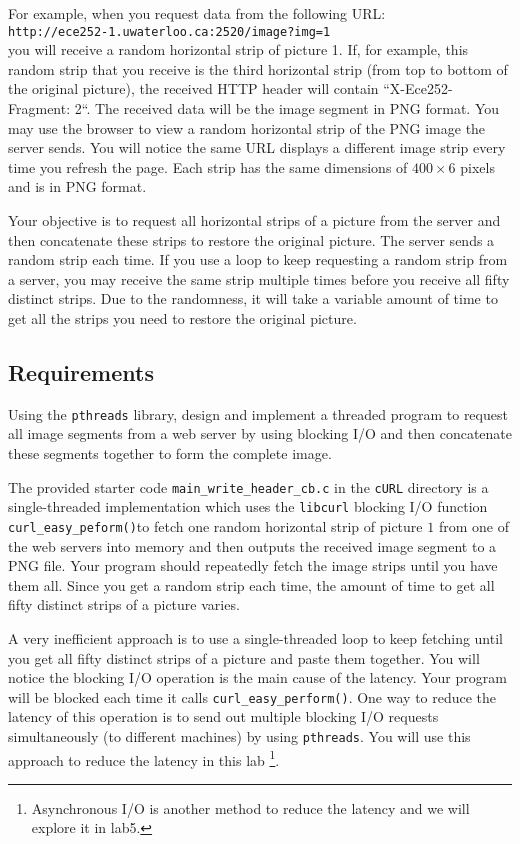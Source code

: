 For example, when you request data from the following URL: \\
\verb+http://ece252-1.uwaterloo.ca:2520/image?img=1+  \\
you will receive a random horizontal strip of picture 1. If, for example, this random strip that you receive is the third horizontal strip (from top to bottom of the original picture), the received HTTP header will contain ``X-Ece252-Fragment: 2``. The received data will be the image segment in PNG format.
You may use the browser to view a random horizontal strip of the PNG image the server sends. You will notice the same URL displays a different image strip every time you refresh the page. Each strip has the same dimensions of $400 \times 6$ pixels and is in PNG format. 

Your objective is to request all horizontal strips of a picture from the server and then concatenate these strips to restore the original picture. The server sends a random strip each time. If you use a loop to keep requesting a random strip from a server, you may receive the same strip multiple times before you receive all fifty distinct strips. Due to the randomness, it will take a variable amount of time to get all the strips you need to restore the original picture.

\subsection{Requirements}

Using the \verb+pthreads+ library, design and implement a threaded program to request all image segments from a web server by using blocking I/O and then concatenate these segments together to form the complete image.

The provided starter code \verb+main_write_header_cb.c+ in the \verb+cURL+ directory is a single-threaded implementation which uses the \verb+libcurl+ blocking I/O function \verb+curl_easy_peform()+to fetch one random horizontal strip of picture $1$ from one of the web servers into memory and then outputs the received image segment to a PNG file. Your  program should repeatedly fetch the image strips until you have them all. Since you get a random strip each time, the amount of time to get all fifty distinct strips of a picture varies.

A very inefficient approach is to use a single-threaded loop to keep fetching until you get all fifty distinct strips of a picture and paste them together. You will notice the blocking I/O operation is the main cause of the latency. Your program will be blocked each time it calls \verb+curl_easy_perform()+. One way to reduce the latency of this operation is to send out multiple blocking I/O requests simultaneously (to different machines) by using \verb+pthreads+. You will use this approach to reduce the latency in this lab
\footnote{Asynchronous I/O is another method to reduce the latency and we will explore it in lab5.}. 

